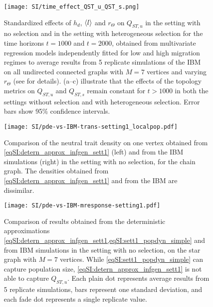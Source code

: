 \begin{figure}[t]
  \centering
    \texttt{[image: SI/time\_effect\_QST\_u\_QST\_s.png]}
    \caption{Standardized effects of $h_d$, $\langle l \rangle$ and $r_\Theta$ on $Q_{ST,u}$ in the setting with no selection and in the setting with heterogeneous selection for the time horizons $t=1000$ and $t=2000$, obtained from multivariate regression models independently fitted for low and high migration regimes to average results from 5 replicate simulations of the IBM on all undirected connected graphs with $M=7$ vertices and varying $r_\Theta$ (see  for details). (a--c) illustrate that the effects of the topology metrics on $Q_{ST,u}$ and  $Q_{ST,s}$ remain constant for $t > 1000$ in both the settings without selection and with heterogeneous selection. Error bars show 95\% confidence intervals. }\label{figSI:time_effect_Q_ST_u}
\end{figure}

\FloatBarrier

\begin{figure}[t]
  \centering
      \texttt{[image: SI/pde-vs-IBM-trans-setting1\_localpop.pdf]}
    \caption{ Comparison of the neutral trait density on one vertex obtained from \cref{eqSI:detern_approx_infgen_sett1} (left) and from the IBM simulations (right) in the setting with no selection, for the chain graph. The densities obtained from \cref{eqSI:detern_approx_infgen_sett1} and from the IBM are dissimilar.}
    \label{figSI:pde-vs-IBM-trans-setting1_localpop}
  \end{figure}
\FloatBarrier


\FloatBarrier

\begin{figure}[t]
  \centering
    \texttt{[image: SI/pde-vs-IBM-mresponse-setting1.pdf]} 
    \caption{Comparison of results obtained from the deterministic approximations \cref{eqSI:detern_approx_infgen_sett1,eqSI:sett1_popdyn_simple} and from IBM simulations in the setting with no selection, on the star graph with $M=7$ vertices. While \cref{eqSI:sett1_popdyn_simple} can capture population size, \cref{eqSI:detern_approx_infgen_sett1} is not able to capture $Q_{ST,u}$. Each plain dot represents average results from 5 replicate simulations, bars represent one standard deviation, and each fade dot represents a single replicate value.
    }
    \label{figSI:pde-vs-IBM-mresponse-setting1}
\end{figure}
\clearpage

